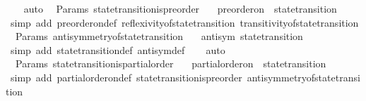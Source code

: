 \begin{isabellebody}
\ \ \isamarkupfalse%
\ auto%
\endisatagproof
{\isafoldproof}%
%
\isadelimproof
\isanewline
%
\endisadelimproof
\isanewline
{}\isamarkupfalse%
\ {\isacharparenleft}\ Params{\isacharparenright}\ state{\isacharunderscore}transition{\isacharunderscore}is{\isacharunderscore}preorder\ {\isacharcolon}\isanewline
\ \ {\isachardoublequoteopen}preorder{\isacharunderscore}on\ {\isasymSigma}\ state{\isacharunderscore}transition{\isachardoublequoteclose}\isanewline
%
\isadelimproof
\ \ %
\endisadelimproof
%
\isatagproof
{}\isamarkupfalse%
\ {\isacharparenleft}simp\ add{\isacharcolon}\ preorder{\isacharunderscore}on{\isacharunderscore}def\ reflexivity{\isacharunderscore}of{\isacharunderscore}state{\isacharunderscore}transition\ transitivity{\isacharunderscore}of{\isacharunderscore}state{\isacharunderscore}transition{\isacharparenright}%
\endisatagproof
{\isafoldproof}%
%
\isadelimproof
\isanewline
%
\endisadelimproof
\isanewline
{}\isamarkupfalse%
\ {\isacharparenleft}\ Params{\isacharparenright}\ antisymmetry{\isacharunderscore}of{\isacharunderscore}state{\isacharunderscore}transition\ {\isacharcolon}\isanewline
\ \ {\isachardoublequoteopen}antisym\ state{\isacharunderscore}transition{\isachardoublequoteclose}\ \ \isanewline
%
\isadelimproof
\ \ %
\endisadelimproof
%
\isatagproof
{}\isamarkupfalse%
\ {\isacharparenleft}simp\ add{\isacharcolon}\ state{\isacharunderscore}transition{\isacharunderscore}def\ antisym{\isacharunderscore}def{\isacharparenright}\isanewline
\ \ \isamarkupfalse%
\ auto%
\endisatagproof
{\isafoldproof}%
%
\isadelimproof
\isanewline
%
\endisadelimproof
\isanewline
{}\isamarkupfalse%
\ {\isacharparenleft}\ Params{\isacharparenright}\ state{\isacharunderscore}transition{\isacharunderscore}is{\isacharunderscore}partial{\isacharunderscore}order\ {\isacharcolon}\isanewline
\ \ {\isachardoublequoteopen}partial{\isacharunderscore}order{\isacharunderscore}on\ {\isasymSigma}\ state{\isacharunderscore}transition{\isachardoublequoteclose}\isanewline
%
\isadelimproof
\ \ %
\endisadelimproof
%
\isatagproof
{}\isamarkupfalse%
\ {\isacharparenleft}simp\ add{\isacharcolon}\ partial{\isacharunderscore}order{\isacharunderscore}on{\isacharunderscore}def\ state{\isacharunderscore}transition{\isacharunderscore}is{\isacharunderscore}preorder\ antisymmetry{\isacharunderscore}of{\isacharunderscore}state{\isacharunderscore}transition{\isacharparenright}%
\endisatagproof
{\isafoldproof}%
%
\isadelimproof
\isanewline

\end{isabellebody}
